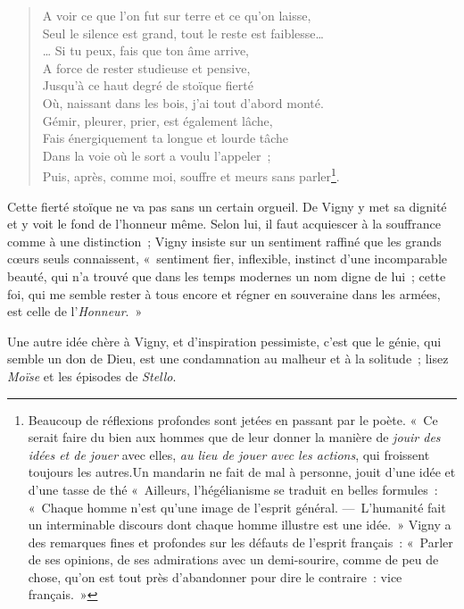 \documentclass[french,twoside]{book} %
\begin{document}
\begin{verse}
A voir ce que l’on fut sur terre et ce qu’on laisse,\\
Seul le silence est grand, tout le reste est faiblesse…\\
… Si tu peux, fais que ton âme arrive,\\
A force de rester studieuse et pensive,\\
Jusqu’à ce haut degré de stoïque fierté\\
Où, naissant dans les bois, j’ai tout d’abord monté.\\
Gémir, pleurer, prier, est également lâche,\\
Fais énergiquement ta longue et lourde tâche\\
Dans la voie où le sort a voulu l’appeler ;\\
Puis, après, comme moi, souffre et meurs sans parler\footnote{ Beaucoup de réflexions profondes sont jetées en passant par le poète. « Ce serait faire du bien aux hommes que de leur donner la manière de \emph{jouir des idées et de jouer} avec elles, \emph{au lieu de jouer avec les actions}, qui froissent toujours les autres.Un mandarin ne fait de mal à personne, jouit d’une idée et d’une tasse de thé « Ailleurs, l’hégélianisme se traduit en belles formules : « Chaque homme n’est qu’une image de l’esprit général. — L’humanité fait un interminable discours dont chaque homme illustre est une idée. » Vigny a des remarques fines et profondes sur les défauts de l’esprit français : « Parler de ses opinions, de ses admirations avec un demi-sourire, comme de peu de chose, qu’on est tout près d’abandonner pour dire le contraire : vice français. »}.\\
\end{verse}

\noindent Cette fierté stoïque ne va pas sans un certain orgueil. De Vigny y met sa dignité et y voit le fond de l’honneur même. Selon lui, il faut acquiescer à la souffrance comme à une distinction ; Vigny insiste sur un sentiment raffiné que les grands cœurs seuls connaissent, « sentiment fier, inflexible, instinct d’une incomparable beauté, qui n’a trouvé que dans les temps modernes un nom digne de lui ; cette foi, qui me semble rester à tous encore et régner en souveraine dans les armées, est celle de l’\emph{Honneur}. »\par
Une autre idée chère à Vigny, et d’inspiration pessimiste, c’est que le génie, qui semble un don de Dieu, est une condamnation au malheur et à la solitude ; lisez \emph{Moïse} et les épisodes de \emph{Stello}.\par
\end{document}
